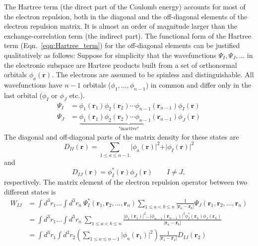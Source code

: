 \documentclass[journal=jpclcd,manuscript=letter]{achemso}
\renewcommand\vec[1]{\mathbf{#1}}
\begin{document}
The Hartree term (the direct part of the Coulomb energy) accounts for most of the electron repulsion, both in the diagonal
and the off-diagonal elements of the electron repulsion matrix.
It is almost an order of magnitude larger than the exchange-correlation term (the indirect part).
The functional form of the Hartree term (Eqn.~\ref{eqn:Hartree_term}) for the off-diagonal elements
can be justified qualitatively as follows:
Suppose for simplicity that the wavefunctions $\Psi_{I},\Psi_{J},\ldots$
in the electronic subspace are Hartree products built from a set of orthonormal orbitals $\phi_{a}(\vec{r})$.
The electrons are assumed to be spinless and distinguishable.
All wavefunctions have $n-1$ orbitals ($\phi_1,\ldots,\phi_{n-1}$) in common
and differ only in the last orbital ($\phi_I$ or $\phi_J$ etc.).
\begin{align}
 \Psi_I &= \phi_1(\vec{r}_1) \phi_2(\vec{r}_2) \cdots \phi_{n-1}(\vec{r}_{n-1}) \phi_{I}(\vec{r}) \\
 \Psi_J &= \underbrace{\phi_1(\vec{r}_1) \phi_2(\vec{r}_2) \cdots \phi_{n-1}(\vec{r}_{n-1})}_{\text{"inactive"}} \phi_{J}(\vec{r})
\end{align}
The diagonal and off-diagonal parts of the matrix density for these states are
\begin{equation}
 D_{II}(\vec{r}) = \sum_{1 \leq a \leq n-1} \vert \phi_a(\vec{r}) \vert^2 + \vert \phi_I(\vec{r}) \vert^2
\end{equation}
and
\begin{equation}
  D_{IJ}(\vec{r}) = \phi^*_I(\vec{r}) \phi_J(\vec{r}) \quad \quad I \neq J,
\end{equation}
respectively. The matrix element of the electron repulsion operator between two different states is
\begin{equation}
  \begin{split}
W_{IJ} &= \int d^3r_1 \ldots \int d^3r_n ~ 
\Psi^*_{I}(\vec{r}_1,\vec{r}_2,\ldots,\vec{r}_n)
\sum_{1 \leq a < b \leq n} \frac{1}{\vert \vec{r}_a - \vec{r}_b \vert}
\Psi_{J}(\vec{r}_1,\vec{r}_2,\ldots,\vec{r}_n) \\
&= \int d^3r_1 \ldots \int d^3r_n ~ 
\sum_{1 \leq a < b \leq n} \frac{
  \vert \phi_1(\vec{r}_1) \vert^2 \ldots \vert \phi_{n-1}(\vec{r}_{n-1}) \vert^2 \phi^*_I(\vec{r}_n) \phi_J(\vec{r}_n)
  }{\vert \vec{r}_a - \vec{r}_b \vert} \\
&= \int d^3r_1 \int d^3r_2 \left(\sum_{1 \leq a \leq n-1} \vert \phi_a(\vec{r}_1) \vert^2 \right)
  \frac{1}{\vert \vec{r}_1 - \vec{r}_2 \vert}
  D_{IJ}(\vec{r}_2) \label{eqn:Hartree_exact_electron_repulsion}
  \end{split}
\end{equation}
\end{document}
